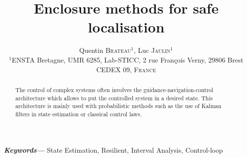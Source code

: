 \documentclass[a4paper]{article}
\title{Enclosure methods for safe localisation}
\author{Quentin \textsc{Brateau}$^{1}$, Luc \textsc{Jaulin}$^{1}$  \\
				\small $^{1}$ENSTA Bretagne, UMR 6285, Lab-STICC, 2 rue François Verny, 29806 Brest CEDEX 09, \textsc{France} \\
}
\date{}
\providecommand{\keywords}[1] {
	\small	
	\textbf{\textit{Keywords---}} #1
}
\begin{document}
	\maketitle

	\begin{abstract}

		The control of complex systems often involves the guidance-navigation-control architecture which allows to put the controlled system in a desired state. This architecture is mainly used with probabilistic methods such as the use of Kalman filters in state estimation or classical control laws.
		
	\end{abstract}

	\hspace{10pt}

	\keywords{State Estimation, Resilient, Interval Analysis, Control-loop}

	
	
\end{document}

